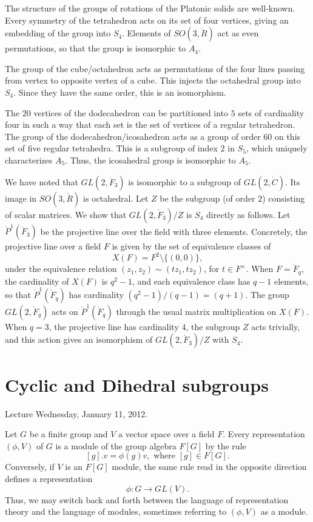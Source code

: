 \documentclass{amsart}
\def\CC{\ring{C}}
\def\RR{\ring{R}}
\begin{document}
The structure of the groups of rotations of the Platonic solids are well-known.
Every symmetry of the tetrahedron acts on its set of four vertices, giving
an embedding of the group into $S_4$.  Elements of $SO(3,\RR)$ act as
even permutations, so that the group is isomorphic to $A_4$.

The group of the cube/octahedron acts as permutations of the four lines passing
from vertex to opposite vertex of a cube.  This injects the octahedral group
into $S_4$.  Since they have the same order, this is an isomorphism.

The $20$ vertices of the dodecahedron can be partitioned into $5$ sets of cardinality
four in such a way that each set is the set of vertices of a regular tetrahedron.
The group of the dodecahedron/icosahedron acts as a group of order $60$ 
on this set of five
regular tetrahedra.  This is a subgroup of index $2$ in $S_5$, which uniquely
characterizes  $A_5$.  Thus, the icosahedral group is isomorphic to $A_5$.

We have noted that $GL(2,\ring{F}_3)$ is isomorphic to a subgroup of
$GL(2,\CC)$.  Its image in $SO(3,\RR)$ is octahedral.  Let
$Z$ be the subgroup (of order $2$) consisting of scalar matrices.  We
show that $GL(2,\ring{F}_3)/Z$ is $S_4$ directly as follows.  Let
$\ring{P}^1(\ring{F}_3)$ be the projective line over the field with
three elements.  Concretely, the projective line over a field $F$ is
given by the set of equivalence classes of
\[
X(F)=F^2 \setminus \{(0,0)\},
\]
under the equivalence relation $(z_1,z_2)\sim (t z_1,t z_2)$, for
$t\in F^\times$.  When $F=\ring{F}_q$, the cardinality of $X(F)$ is
$q^2-1$, and each equivalence class has $q-1$ elements, so that
$\ring{P}^1(\ring{F}_q)$ has cardinality $(q^2-1)/(q-1)=(q+1)$.  The
group $GL(2,\ring{F}_q)$ acts on $\ring{P}^1(\ring{F}_q)$ through the
usual matrix multiplication on $X(F)$.  When $q=3$, the projective
line has cardinality $4$, the subgroup $Z$ acts trivially, and this
action gives an isomorphism of $GL(2,\ring{F}_3)/Z$ with $S_4$.


\newpage
\section{Cyclic and Dihedral subgroups}

Lecture Wednesday, January 11, 2012.


Let $G$ be a finite group and $V$ a vector space over a field $F$.  
Every representation $(\phi,V)$ of $G$
is a module of the group algebra $F[G]$ by the rule 
\[
[g].v = \phi(g)v, \text{ where } [g]\in F[G].
\]
Conversely, if $V$ is an $F[G]$ module, the same rule read in the opposite
direction defines a representation
\[
\phi:G\to GL(V).
\]
Thus, we may switch back and forth between the language of representation
theory and the language of modules, sometimes referring to $(\phi,V)$ as
a module.
\end{document}
